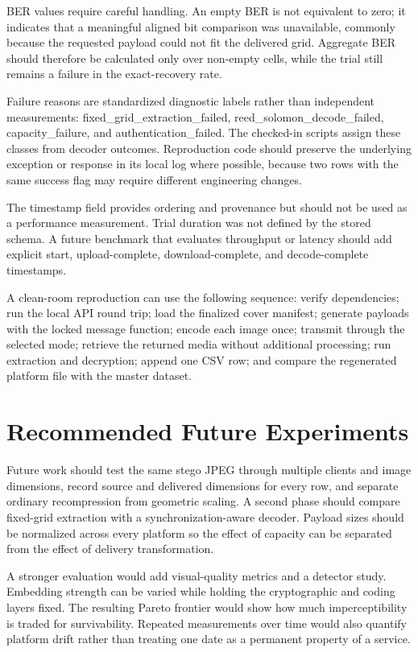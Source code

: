 \documentclass[conference]{IEEEtran}
\newcommand{\safeSection}[1]{\Needspace{5\baselineskip}\section{#1}}
\begin{document}
BER values require careful handling. An empty BER is not equivalent to zero; it indicates that a meaningful aligned bit comparison was unavailable, commonly because the requested payload could not fit the delivered grid. Aggregate BER should therefore be calculated only over non-empty cells, while the trial still remains a failure in the exact-recovery rate.

Failure reasons are standardized diagnostic labels rather than independent measurements: fixed\_grid\_extraction\_failed, reed\_solomon\_decode\_failed, capacity\_failure, and authentication\_failed. The checked-in scripts assign these classes from decoder outcomes. Reproduction code should preserve the underlying exception or response in its local log where possible, because two rows with the same success flag may require different engineering changes.

The timestamp field provides ordering and provenance but should not be used as a performance measurement. Trial duration was not defined by the stored schema. A future benchmark that evaluates throughput or latency should add explicit start, upload-complete, download-complete, and decode-complete timestamps.

A clean-room reproduction can use the following sequence: verify dependencies; run the local API round trip; load the finalized cover manifest; generate payloads with the locked message function; encode each image once; transmit through the selected mode; retrieve the returned media without additional processing; run extraction and decryption; append one CSV row; and compare the regenerated platform file with the master dataset.

\safeSection{Recommended Future Experiments}
Future work should test the same stego JPEG through multiple clients and image dimensions, record source and delivered dimensions for every row, and separate ordinary recompression from geometric scaling. A second phase should compare fixed-grid extraction with a synchronization-aware decoder. Payload sizes should be normalized across every platform so the effect of capacity can be separated from the effect of delivery transformation.

A stronger evaluation would add visual-quality metrics and a detector study. Embedding strength can be varied while holding the cryptographic and coding layers fixed. The resulting Pareto frontier would show how much imperceptibility is traded for survivability. Repeated measurements over time would also quantify platform drift rather than treating one date as a permanent property of a service.
\end{document}
